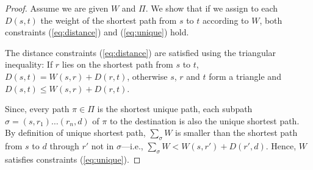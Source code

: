 \begin{proof}
Assume we are given $W$ and $\Pi$.
We show that if we assign to each $D(s,t)$ the weight of the shortest 
path from $s$ to $t$ according to $W$, both constraints (\ref{eq:distance}) and (\ref{eq:unique}) hold. 

The distance constraints (\ref{eq:distance}) are satisfied using
the triangular inequality: If $r$ lies on the shortest path from $s$ to
$t$, $D(s,t) = W(s,r) + D(r,t)$, otherwise $s$, $r$ and $t$  form a 
triangle and $D(s,t) \leq W(s,r) + D(r,t)$. 

Since, every path $\pi \in \Pi$ is the shortest unique path, each subpath 
$\sigma = (s, r_1)\ldots(r_n, d)$ 
of $\pi$ to the destination is also the unique shortest  path. By 
definition of unique shortest path, $\sum_\sigma W$ is smaller than the shortest path
from $s$ to $d$ through $r'$ not in $\sigma$---i.e., $\sum_\sigma W < W(s, r') + D(r', d)$. Hence, $W$ satisfies constraints 
(\ref{eq:unique}). 
\end{proof}